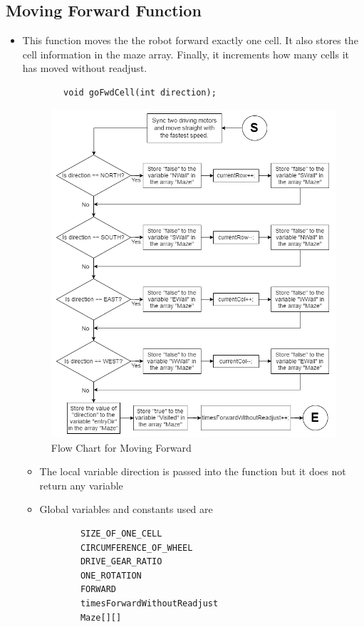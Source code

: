 \documentclass[11pt]{article}
\begin{document}
\subsection{Moving Forward Function}
\begin{itemize}
\item This function moves the the robot forward exactly one cell. It also stores the cell information in the maze array. Finally, it increments how many cells it has moved without readjust. 
	\begin{verbatim}
		void goFwdCell(int direction);
	\end{verbatim}
\begin{figure}[htp]
\centering
\includegraphics[scale=0.52]{images/Software_Flowchart/Moving_Forward.png}
\caption{Flow Chart for Moving Forward}
\label{}
\end{figure}	
	\begin{itemize}
	\item The local variable direction is passed into the function but it does not return any variable
	\item Global variables and constants used are
	\begin{verbatim}
		SIZE_OF_ONE_CELL
		CIRCUMFERENCE_OF_WHEEL
		DRIVE_GEAR_RATIO
		ONE_ROTATION
		FORWARD
		timesForwardWithoutReadjust
		Maze[][]
	\end{verbatim}
	\end{itemize}
\end{itemize}
\newpage
\end{document}
